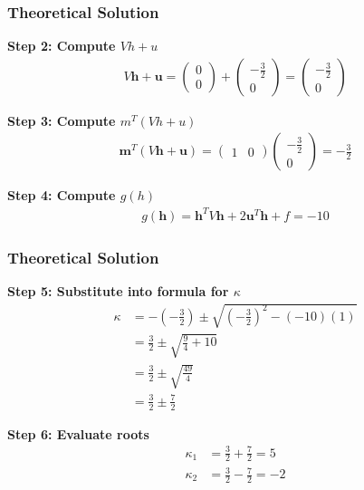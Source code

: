 \documentclass{beamer}
\theoremstyle{remark}
\newcommand{\myvec}[1]{\ensuremath{\begin{pmatrix}#1\end{pmatrix}}}
\let\vec\mathbf
\numberwithin{equation}{section}
\begin{document}
\begin{frame}
\frametitle{Theoretical Solution}
\noindent\textbf{Step 2: Compute $Vh + u$}  
\begin{align}
V\vec{h} + \vec{u} = \myvec{0 \\ 0} + \myvec{-\tfrac{3}{2} \\ 0} = \myvec{-\tfrac{3}{2} \\ 0}
\end{align}

\noindent\textbf{Step 3: Compute $m^T(Vh+u)$}  
\begin{align}
\vec{m}^T(V\vec{h}+\vec{u}) = \myvec{1 & 0}\myvec{-\tfrac{3}{2} \\ 0} = -\tfrac{3}{2}
\end{align}

\noindent\textbf{Step 4: Compute $g(h)$}  
\begin{align}
g(\vec{h}) = \vec{h}^T V \vec{h} + 2\vec{u}^T \vec{h} + f = -10
\end{align}

\end{frame}

\begin{frame}
\frametitle{Theoretical Solution}
\noindent\textbf{Step 5: Substitute into formula for $\kappa$}  
\begin{align}
\kappa &= -(-\tfrac{3}{2}) \pm \sqrt{\left(-\tfrac{3}{2}\right)^2 - (-10)(1)} \\[1ex]
&= \tfrac{3}{2} \pm \sqrt{\tfrac{9}{4} + 10} \\[1ex]
&= \tfrac{3}{2} \pm \sqrt{\tfrac{49}{4}} \\[1ex]
&= \tfrac{3}{2} \pm \tfrac{7}{2}
\end{align}

\noindent\textbf{Step 6: Evaluate roots}  
\begin{align}
\kappa_1 &= \tfrac{3}{2} + \tfrac{7}{2} = 5 \\
\kappa_2 &= \tfrac{3}{2} - \tfrac{7}{2} = -2
\end{align}


\end{frame}
\end{document}
